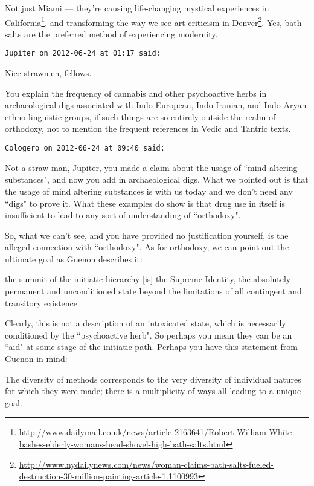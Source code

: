 \begin{footnotesize}
\begin{sffamily}
Not just Miami — they're causing life-changing mystical experiences in California\footnote{\url{http://www.dailymail.co.uk/news/article-2163641/Robert-William-White-bashes-elderly-womans-head-shovel-high-bath-salts.html}}, and transforming the way we see art criticism in Denver\footnote{\url{http://www.nydailynews.com/news/woman-claims-bath-salts-fueled-destruction-30-million-painting-article-1.1100993}}. Yes, bath salts are the preferred method of experiencing modernity.


\hfill

\texttt{Jupiter on 2012-06-24 at 01:17 said: }

Nice strawmen, fellows.

You explain the frequency of cannabis and other psychoactive herbs in archaeological digs associated with Indo-European, Indo-Iranian, and Indo-Aryan ethno-linguistic groups, if such things are so entirely outside the realm of orthodoxy, not to mention the frequent references in Vedic and Tantric texts.


\hfill

\texttt{Cologero on 2012-06-24 at 09:40 said: }

Not a straw man, Jupiter, you made a claim about the usage of ``mind altering substances", and now you add in archaeological digs. What we pointed out is that the usage of mind altering substances is with us today and we don't need any ``digs" to prove it. What these examples do show is that drug use in itself is insufficient to lead to any sort of understanding of ``orthodoxy".

So, what we can't see, and you have provided no justification yourself, is the alleged connection with ``orthodoxy". As for orthodoxy, we can point out the ultimate goal as Guenon describes it:

\begin{quotex}
the summit of the initiatic hierarchy [is] the Supreme Identity, the absolutely permanent and unconditioned state beyond the limitations of all contingent and transitory existence

\end{quotex}
Clearly, this is not a description of an intoxicated state, which is necessarily conditioned by the ``psychoactive herb". So perhaps you mean they can be an ``aid" at some stage of the initiatic path. Perhaps you have this statement from Guenon in mind:

\begin{quotex}
The diversity of methods corresponds to the very diversity of individual natures for which they were made; there is a multiplicity of ways all leading to a unique goal.


\end{quotex}
\end{sffamily}
\end{footnotesize}
